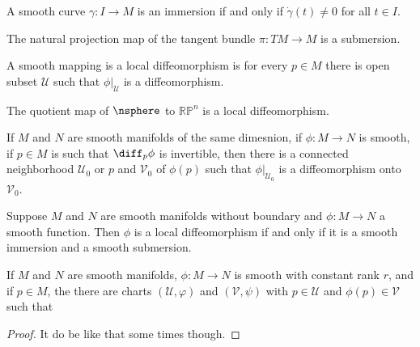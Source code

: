         \begin{example}
            A smooth curve $\gamma:I\rightarrow{M}$ is an immersion if and only
            if $\dot{\gamma}(t)\ne{0}$ for all $t\in{I}$.
        \end{example}
        \begin{example}
            The natural projection map of the tangent bundle
            $\pi:TM\rightarrow{M}$ is a submersion.
        \end{example}
        \begin{definition}
            A smooth mapping is a local diffeomorphism is for every $p\in{M}$
            there is open subset $\mathcal{U}$ such that $\phi|_{\mathcal{U}}$
            is a diffeomorphism.
        \end{definition}
        \begin{example}
            The quotient map of $\nsphere$ to $\mathbb{RP}^{n}$ is a local
            diffeomorphism.
        \end{example}
        \begin{theorem}
            If $M$ and $N$ are smooth manifolds of the same dimesnion, if
            $\phi:M\rightarrow{N}$ is smooth, if $p\in{M}$ is such that
            $\diff_{p}\phi$ is invertible, then there is a connected
            neighborhood $\mathcal{U}_{0}$ or $p$ and $\mathcal{V}_{0}$ of
            $\phi(p)$ such that $\phi|_{\mathcal{U}_{0}}$ is a diffeomorphism
            onto $\mathcal{V}_{0}$.
        \end{theorem}
        \begin{theorem}
            Suppose $M$ and $N$ are smooth manifolds without boundary and
            $\phi:M\rightarrow{N}$ a smooth function. Then $\phi$ is a local
            diffeomorphism if and only if it is a smooth immersion and a smooth
            submersion.
        \end{theorem}
        \begin{theorem}
            If $M$ and $N$ are smooth manifolds, $\phi:M\rightarrow{N}$ is
            smooth with constant rank $r$, and if $p\in{M}$, the there are
            charts $(\mathcal{U},\varphi)$ and $(\mathcal{V},\psi)$ with
            $p\in\mathcal{U}$ and $\phi(p)\in\mathcal{V}$ such that
        \end{theorem}
        \begin{proof}
            It do be like that some times though.
        \end{proof}

